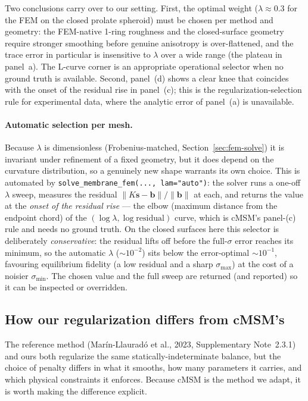 \documentclass[11pt]{article}
\newcommand{\vv}[1]{\bm{#1}}          %
\begin{document}
Two conclusions carry over to our setting.  First, the optimal weight ($\lambda\approx0.3$
for the FEM on the closed prolate spheroid) must be chosen per method and geometry: the
FEM-native 1-ring roughness and the closed-surface geometry require stronger smoothing
before genuine anisotropy is over-flattened, and the trace error in particular is
insensitive to $\lambda$ over a wide range (the plateau in panel~a).  The L-curve
corner is an appropriate operational selector when no ground truth is available.
Second, panel~(d) shows a clear knee that coincides with the onset of the residual
rise in panel~(c); this is the regularization-selection rule for experimental data,
where the analytic error of panel~(a) is unavailable.

\paragraph{Automatic selection per mesh.}  Because $\lambda$ is dimensionless
(Frobenius-matched, Section~\ref{sec:fem-solve}) it is invariant under refinement of a
fixed geometry, but it does depend on the curvature distribution, so a genuinely new
shape warrants its own choice.  This is automated by \texttt{solve\_membrane\_fem(...,
lam="auto")}: the solver runs a one-off $\lambda$ sweep, measures the residual
$\|K\vv s-\vv b\|/\|\vv b\|$ at each, and returns the value at the \emph{onset of the
residual rise} --- the elbow (maximum distance from the endpoint chord) of the
$(\log\lambda,\log\mathrm{residual})$ curve, which is cMSM's panel-(c) rule and needs
no ground truth.  On the closed surfaces here this selector is deliberately
\emph{conservative}: the residual lifts off before the full-$\sigma$ error reaches its
minimum, so the automatic $\lambda$ ($\sim\!10^{-2}$) sits below the error-optimal
$\sim\!10^{-1}$, favouring equilibrium fidelity (a low residual and a sharp
$\sigma_{\max}$) at the cost of a noisier $\sigma_{\min}$.  The chosen value and the
full sweep are returned (and reported) so it can be inspected or overridden.

\subsection{How our regularization differs from cMSM's}
\label{sec:fem-reg-vs-cmsm}

The reference method (Mar\'in-Llaurad\'o et al., 2023, Supplementary Note~2.3.1) and
ours both regularize the same statically-indeterminate balance, but the choice of
penalty differs in what it smooths, how many parameters it carries, and which
physical constraints it enforces.  Because cMSM is the method we adapt, it is worth
making the difference explicit.
\end{document}
